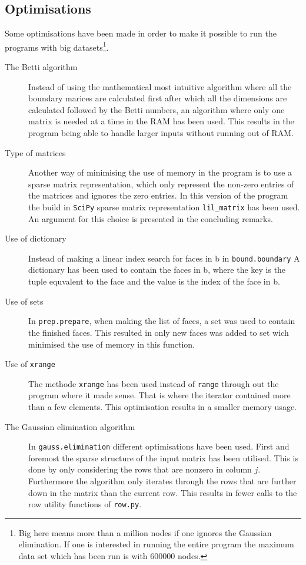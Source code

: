 \documentclass[11pt,a4paper,twoside, openright]{report}
\begin{document}
\subsection{Optimisations}
Some optimisations have been made in order to make it possible to run the programs with big datasets\footnote{Big here means more than a million nodes if one ignores the Gaussian elimination. If one is interested in running the entire program the maximum data set which has been run is with 600000 nodes.}.
\begin{description}
\item[The Betti algorithm] Instead of using the mathematical most intuitive algorithm where all the boundary marices are calculated first after which all the dimensions are calculated followed by the Betti numbers, an algorithm where only one matrix is needed at a time in the RAM has been used. This results in the program being able to handle larger inputs without running out of RAM.
\item[Type of matrices] Another way of minimising the use of memory in the program is to use a sparse matrix representation, which only represent the non-zero entries of the matrices and ignores the zero entries. In this version of the program the build in \texttt{SciPy} sparse matrix representation \texttt{lil\_matrix} has been used. An argument for this choice is presented in the concluding remarks.
\item[Use of dictionary] Instead of making a linear index search for faces in b in \texttt{bound.boundary} A dictionary has been used to contain the faces in b, where the key is the tuple equvalent to the face and the value is the index of the face in b.
\item[Use of sets] In \texttt{prep.prepare}, when making the list of faces, a set was used to contain the finished faces. This resulted in only new faces was added to set wich minimised the use of memory in this function.
\item[Use of \texttt{xrange}] The methode \texttt{xrange} has been used instead of \texttt{range} through out the program where it made sense. That is where the iterator contained more than a few elements. This optimisation results in a smaller memory usage.
\item[The Gaussian elimination algorithm] In \texttt{gauss.elimination} different optimisations have been used. First and foremost the sparse structure of the input matrix has been utilised. This is done by only considering the rows that are nonzero in column $j$. Furthermore the algorithm only iterates through the rows that are further down in the matrix than the current row. This results in fewer calls to the row utility functions of \texttt{row.py}.

\end{description}
\end{document}
